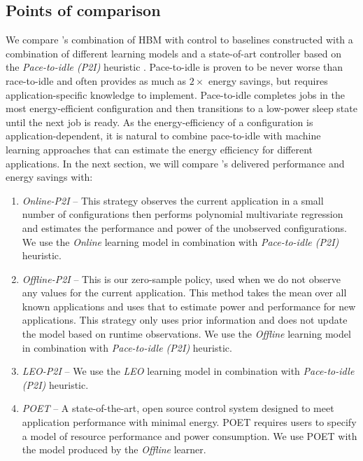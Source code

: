 \subsection{Points of comparison}
We compare \SYSTEM{}'s combination of HBM with control to baselines
constructed with a combination of different learning models and a
state-of-art controller based on the \emph{Pace-to-idle (P2I)}
heuristic \cite{kim-cpsna}.  Pace-to-idle is proven to be never worse
than race-to-idle and often provides as much as $2\times$ energy
savings, but requires application-specific knowledge to implement.
Pace-to-idle completes jobs in the most energy-efficient configuration
and then transitions to a low-power sleep state until the next job is
ready.  As the energy-efficiency of a configuration is
application-dependent, it is natural to combine pace-to-idle with
machine learning approaches that can estimate the energy efficiency
for different applications.  In the next section, we will compare
\SYSTEM{}'s delivered performance and energy savings with:
\begin{enumerate}
\item \textit{Online-P2I} -- This strategy observes the current
  application in a small number of configurations then performs
  polynomial multivariate regression and estimates the performance and
  power of the unobserved configurations. We use the \textit{Online} learning model
  in combination with \emph{Pace-to-idle (P2I)} heuristic.
\item \textit{Offline-P2I} -- This is our zero-sample policy, used when we
  do not observe any values for the current application. This method
  takes the mean over all known applications and uses that to estimate
  power and performance for new applications. This strategy only uses
  prior information and does not update the model based on runtime
  observations. We use the \textit{Offline} learning
  model in combination with \emph{Pace-to-idle (P2I)} heuristic.
\item \textit{LEO-P2I} -- We use the \textit{LEO} learning model in
  combination with \emph{Pace-to-idle (P2I)} heuristic.
\item \textit{POET} -- A state-of-the-art, open source control system
  designed to meet application performance with minimal energy.  POET
  requires users to specify a model of resource performance and power
  consumption.  We use POET with the model produced by the
  \emph{Offline} learner.
\end{enumerate}

